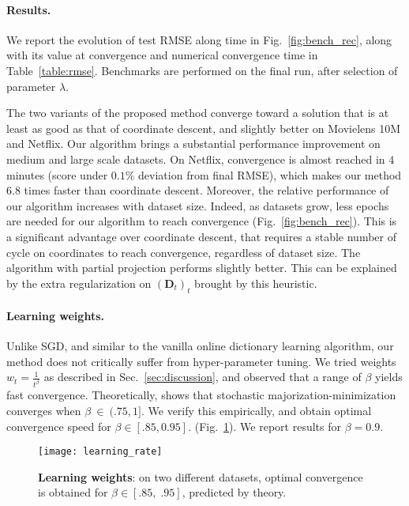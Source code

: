\documentclass{article}
\def\D{{\mathbf D}}
\begin{document}
\paragraph{Results.}We report the evolution of test RMSE along time in
Fig.~\ref{fig:bench_rec}, along with its value at convergence and numerical convergence
time in Table~\ref{table:rmse}. Benchmarks are performed on the final run,
after selection of parameter $\lambda$.

The two variants of the proposed method
converge toward a solution that is at least as good as that of
coordinate descent, and slightly better on Movielens 10M and Netflix.
Our algorithm brings a substantial performance improvement on medium
and large scale datasets. On Netflix, convergence is almost reached in $4$
minutes (score under $0.1\%$ deviation from final RMSE), which makes our method $6.8$ times faster than coordinate descent.
Moreover, the relative performance of our algorithm increases with
dataset size. Indeed, as datasets grow,
less epochs are needed for our algorithm to reach convergence (Fig.~\ref{fig:bench_rec}). This is a
significant advantage over coordinate descent, that requires a stable number of
cycle on coordinates to reach convergence, regardless of dataset size.
The algorithm with partial projection performs slightly better. This can be explained by the extra regularization on $(\D_t)_t$ brought by this heuristic.

\paragraph{Learning weights.}
Unlike SGD, and similar to the vanilla online dictionary learning algorithm, our method does not
critically suffer from hyper-parameter tuning. We tried weights
$w_t = \frac{1}{t^\beta}$ as described in Sec.~\ref{sec:discussion}, and observed that a range of $\beta$ yields fast convergence.
Theoretically, \citet{mairal_stochastic_2013} shows that stochastic
majorization-minimization converges when $\beta~\in~(.75, 1]$. We verify this empirically, and obtain optimal convergence speed for $\beta \in
[.85, 0.95]$.
(Fig.~\ref{fig:learning_rate}). We report results for $\beta = 0.9$.

\begin{figure}[hbt]
\texttt{[image: learning\_rate]}
  \vspace{-.5em}
  \caption{\textbf{Learning weights}:
on two different datasets, optimal convergence is obtained for $\beta \in [.85,\; .95]$, predicted by theory.
  \label{fig:learning_rate}}
  \vspace{-.5em}
\end{figure}
\end{document}
